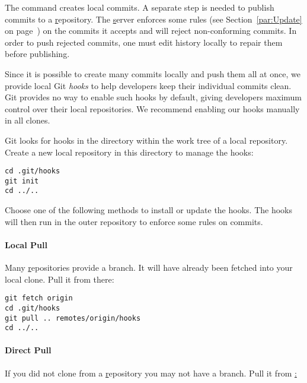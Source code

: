 The  command creates local commits. A separate 
step is needed to publish commits to a \href{public.kitware.com} repository. The
\href{public.kitware.com} server enforces some rules (see
Section~\ref{par:Update} on page~\pageref{par:Update}) on the commits it
accepts and will reject non-conforming commits. In order to push rejected
commits, one must edit history locally to repair them before publishing.

Since it is possible to create many commits locally and push them all at once,
we provide local Git \textit{hooks} to help developers keep their individual
commits clean. Git provides no way to enable such hooks by default, giving
developers maximum control over their local repositories. We recommend enabling
our hooks manually in all clones.

Git looks for hooks in the  directory within the work tree of a
local repository. Create a new local repository in this directory to manage the
hooks:

\begin{verbatim}
cd .git/hooks
git init
cd ../..
\end{verbatim}

Choose one of the following methods to install or update the hooks. The hooks
will then run in the outer repository to enforce some rules on commits.


\paragraph{Local Pull}
\label{par:LocalPull}

Many \href{public.kitware.com} repositories provide a  branch. It
will have already been fetched into your local clone. Pull it from there:

\begin{verbatim}
git fetch origin
cd .git/hooks
git pull .. remotes/origin/hooks
cd ../..
\end{verbatim}


\paragraph{Direct Pull}
\label{par:DirectPull}

If you did not clone from a \href{public.kitware.com} repository you may not
have a  branch. Pull it from \href{public.kitware.com}:

